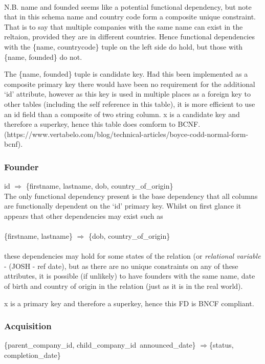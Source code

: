 \documentclass[12pt]{article}
\begin{document}
\\ N.B. name and founded seems like a potential functional dependency, but note that in this schema name and country code form a composite unique constraint. That is to say that multiple companies with the same name can exist in the reltaion, provided they are in different countries. Hence functional dependencies with the \{{name, countrycode\}} tuple on the left side do hold, but those with \{{name, founded\}} do not.

The \{{name, founded\}} tuple is candidate key. Had this been implemented as a composite primary key there would have been no requirement for the additional `id' attribute, however as this key is used in multiple places as a foreign key to other tables (including the self reference in this table), it is more efficient to use an id field than a composite of two string column. x is a candidate key and therefore a superkey, hence this table does comform to BCNF. (https://www.vertabelo.com/blog/technical-articles/boyce-codd-normal-form-bcnf).

\subsubsection{Founder}
id $\Rightarrow$ \{{firstname, lastname, dob, country\_of\_origin\}}\\

The only functional dependency present is the base dependency that all columns are functionally dependent on the `id' primary key. Whilst on first glance it appears that other dependencies may exist such as \\\\
\{{firstname, lastname\}} $\Rightarrow$ \{{dob, country\_of\_origin\}}\\\\
these dependencies may hold for some states of the relation (or \emph{relational variable} - (JOSH - ref date), but as there are no unique constraints on any of these attributes, it is possible (if unlikely) to have founders with the same name, date of birth and country of origin in the relation (just as it is in the real world).

x is a primary key and therefore a superkey, hence this FD is BNCF compliant.

\subsubsection{Acquisition}
\{{parent\_company\_id, child\_company\_id\, announced\_date}\} $\Rightarrow${\{status, completion\_date}\} \\
\end{document}
